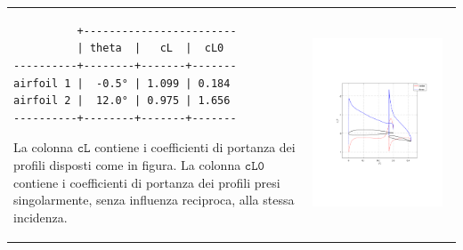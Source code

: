 \begin{tabular}{ll}
\begin{minipage}{0.43\textwidth}
\begin{center}
\begin{verbatim}
          +------------------------
          | theta  |   cL  |  cL0 
----------+--------+-------+-------
airfoil 1 |  -0.5° | 1.099 | 0.184
airfoil 2 |  12.0° | 0.975 | 1.656
----------+--------+-------+-------
\end{verbatim}
\end{center}
La colonna $\mathtt{cL}$ contiene i coefficienti di portanza dei profili
 disposti
 come in figura. La colonna $\mathtt{cL0}$ contiene i coefficienti di portanza
 dei
 profili presi singolarmente, senza influenza reciproca, alla stessa incidenza.
 
\end{minipage}
&
\begin{minipage}{0.57\textwidth}
\begin{center}
\includegraphics[width=0.95\textwidth,trim={3cm 6cm 2cm 6cm},clip]
        {./fig/Aileron.pdf}
\end{center}
\end{minipage}
\end{tabular}

